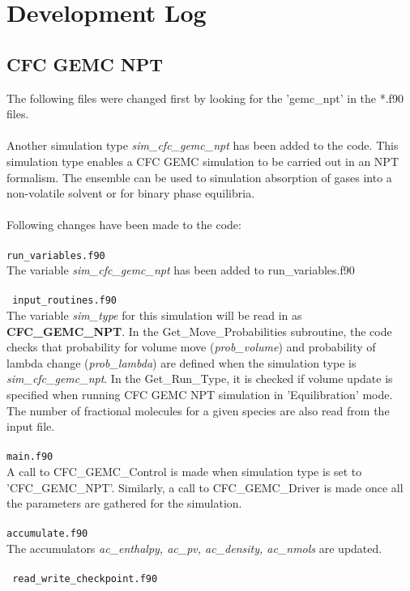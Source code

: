 \section{Development Log}
\subsection{CFC GEMC NPT}
%
%
% 
The following files were changed first by looking for the 'gemc\_npt' in the *.f90 files. \\ \\
%
Another simulation type {\em sim\_cfc\_gemc\_npt} has been added to the code. This simulation type enables a CFC GEMC simulation to be carried out in an NPT formalism. The ensemble can be used to simulation absorption of gases into a non-volatile solvent or for binary phase equilibria. \\ \\
%
Following changes have been made to the code: \\ \\
%
\texttt{run\_variables.f90} \\ 

The variable {\em sim\_cfc\_gemc\_npt} has been added to run\_variables.f90 \\ \\
%
\texttt{ input\_routines.f90} \\

The variable {\em sim\_type} for this simulation will be read in as {\bf CFC\_GEMC\_NPT}. In the {Get\_Move\_Probabilities} subroutine, the code checks that probability for volume move ({\em prob\_volume}) and probability of lambda change ({\em prob\_lambda}) are defined when the simulation type is {\em sim\_cfc\_gemc\_npt}. In the {Get\_Run\_Type}, it is checked if volume update is specified when running CFC GEMC NPT simulation in 'Equilibration' mode. The number of fractional molecules for a given species are also read from  the input file.\\ \\
%
\texttt{main.f90} \\

A call to CFC\_GEMC\_Control is made when simulation type is set to 'CFC\_GEMC\_NPT'. Similarly, a call to {CFC\_GEMC\_Driver} is made once all the parameters are gathered for the simulation. \\ \\
%
\texttt{accumulate.f90} \\

 
 The accumulators {\em ac\_enthalpy, ac\_pv, ac\_density, ac\_nmols} are updated. \\ \\
 \texttt{ read\_write\_checkpoint.f90} \\
 
